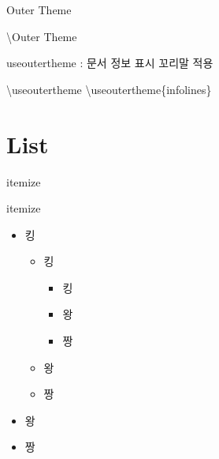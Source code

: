\documentclass[ aspectratio=169,  10pt,blue,xcolor=pdftex,dvipsnames,table,handout,notes]{beamer}
\begin{document}
		\begin{frame}[t]{Outer Theme}

			\begin{block} {\textbackslash Outer Theme}
			\end{block}
		\end{frame}



		\begin{frame}{useoutertheme : 문서 정보 표시 꼬리말 적용}

			\begin{block} {\textbackslash useoutertheme}
			\textbackslash useoutertheme\{infolines\}
			\end{block}
		\end{frame}





		\section{List}

		\begin{frame}[plain]
		\centering

		\end{frame}


		\begin{frame}[t]{itemize}

			\begin{block} {itemize}
				\begin{itemize}
				\item 킹
						\begin{itemize}
						\item 킹
								\begin{itemize}
								\item 킹
								\item 왕
								\item 짱
								\end{itemize}
						\item 왕
						\item 짱
						\end{itemize}
				\item 왕
				\item 짱
				\end{itemize}
			\end{block}

		\end{frame}
\end{document}
